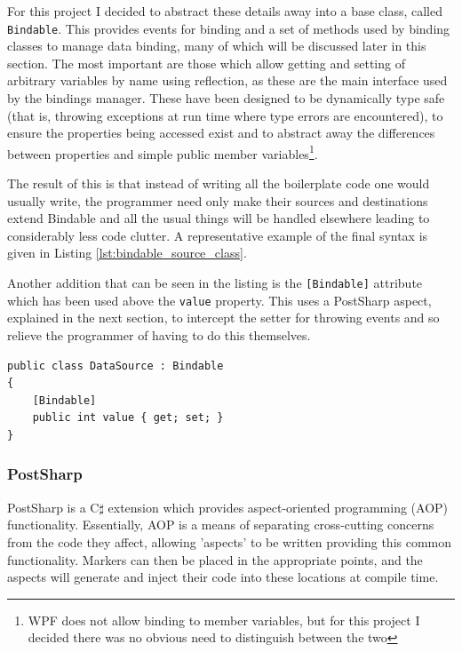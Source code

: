 \documentclass[12pt,twoside,notitlepage]{report}
\begin{document}
For this project I decided to abstract these details away into a base class, called \texttt{Bindable}. This provides events for binding and a set of methods used by binding classes to manage data binding, many of which will be discussed later in this section. The most important are those which allow getting and setting of arbitrary variables by name using reflection, as these are the main interface used by the bindings manager. These have been designed to be dynamically type safe (that is, throwing exceptions at run time where type errors are encountered), to ensure the properties being accessed exist and to abstract away the differences between properties and simple public member variables\footnote{WPF does not allow binding to member variables, but for this project I decided there was no obvious need to distinguish between the two}.

The result of this is that instead of writing all the boilerplate code one would usually write, the programmer need only make their sources and destinations extend Bindable and all the usual things will be handled elsewhere leading to considerably less code clutter. A representative example of the final syntax is given in Listing \ref{lst:bindable_source_class}.

Another addition that can be seen in the listing is the \texttt{[Bindable]} attribute which has been used above the \texttt{value} property. This uses a PostSharp aspect, explained in the next section, to intercept the setter for throwing events and so relieve the programmer of having to do this themselves.

\begin{lstlisting}[language={[Sharp]C}, caption={Creating a bindable source class}, label=lst:bindable_source_class]
public class DataSource : Bindable
{
	[Bindable]
	public int value { get; set; }
}
\end{lstlisting}

\subsubsection*{PostSharp}

PostSharp is a C$\sharp$ extension which provides aspect-oriented programming (AOP) functionality. Essentially, AOP is a means of separating cross-cutting concerns from the code they affect, allowing 'aspects' to be written providing this common functionality. Markers can then be placed in the appropriate points, and the aspects will generate and inject their code into these locations at compile time.
\end{document}
